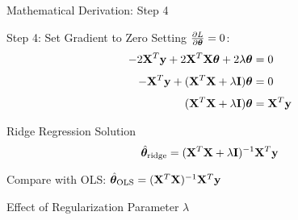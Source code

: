 \documentclass{beamer}
\begin{document}
\begin{frame}{Mathematical Derivation: Step 4}
\begin{codebox}{Step 4: Set Gradient to Zero}
Setting $\frac{\partial L}{\partial \boldsymbol{\theta}} = 0$:
\begin{align}
-2\mathbf{X}^T\mathbf{y} + 2\mathbf{X}^T\mathbf{X}\boldsymbol{\theta} + 2\lambda\boldsymbol{\theta} &= 0 \\[0.3em]
-\mathbf{X}^T\mathbf{y} + (\mathbf{X}^T\mathbf{X} + \lambda\mathbf{I})\boldsymbol{\theta} &= 0 \\[0.3em]
(\mathbf{X}^T\mathbf{X} + \lambda\mathbf{I})\boldsymbol{\theta} &= \mathbf{X}^T\mathbf{y}
\end{align}
\end{codebox}
\pause

\begin{theorembox}{Ridge Regression Solution}
$$\hat{\boldsymbol{\theta}}_{\text{ridge}} = (\mathbf{X}^T\mathbf{X} + \lambda\mathbf{I})^{-1}\mathbf{X}^T\mathbf{y}$$
\end{theorembox}

Compare with OLS: $\hat{\boldsymbol{\theta}}_{\text{OLS}} = (\mathbf{X}^T\mathbf{X})^{-1}\mathbf{X}^T\mathbf{y}$
\end{frame}

\begin{frame}{Effect of Regularization Parameter $\lambda$}
\vspace{0.4cm}
\end{frame}

\end{document}
